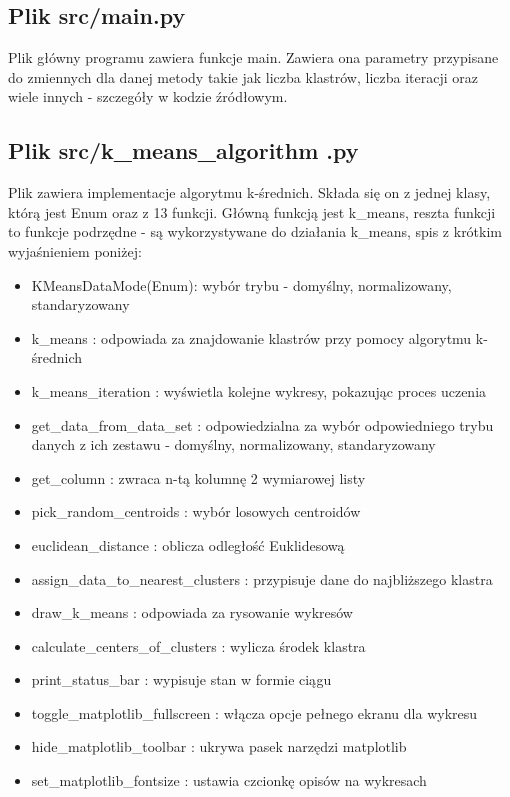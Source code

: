 \documentclass{classrep}
\begin{document}
{        \subsection{Plik src/main.py}
        {
            Plik główny programu zawiera funkcje main. Zawiera ona parametry przypisane do zmiennych dla danej metody takie jak
            liczba klastrów, liczba iteracji oraz wiele innych - szczegóły w kodzie źródłowym.
        }
        \subsection{Plik src/k\_means\_algorithm .py}
        {
            Plik zawiera implementacje algorytmu k-średnich. Składa się on z jednej klasy, którą jest Enum oraz z 13 funkcji.
            Główną funkcją jest k\_means, reszta funkcji to funkcje podrzędne - są wykorzystywane do działania k\_means, spis
        z krótkim wyjaśnieniem poniżej:
            \begin{itemize}
                \item KMeansDataMode(Enum): wybór trybu - domyślny, normalizowany, standaryzowany
                \item k\_means : odpowiada za znajdowanie klastrów przy pomocy algorytmu k-średnich
                \item k\_means\_iteration : wyświetla kolejne wykresy, pokazując proces uczenia
                \item get\_data\_from\_data\_set : odpowiedzialna za wybór odpowiedniego trybu danych z ich zestawu - domyślny,
                normalizowany, standaryzowany
                \item get\_column : zwraca n-tą kolumnę 2 wymiarowej listy
                \item pick\_random\_centroids : wybór losowych centroidów
                \item euclidean\_distance : oblicza odległość Euklidesową
                \item assign\_data\_to\_nearest\_clusters : przypisuje dane do najbliższego klastra
                \item draw\_k\_means : odpowiada za rysowanie wykresów
                \item calculate\_centers\_of\_clusters : wylicza środek klastra
                \item print\_status\_bar : wypisuje stan w formie ciągu
                \item toggle\_matplotlib\_fullscreen : włącza opcje pełnego ekranu dla wykresu
                \item hide\_matplotlib\_toolbar : ukrywa pasek narzędzi matplotlib
                \item set\_matplotlib\_fontsize : ustawia czcionkę opisów na wykresach
            \end{itemize}
        }
}
\end{document}
